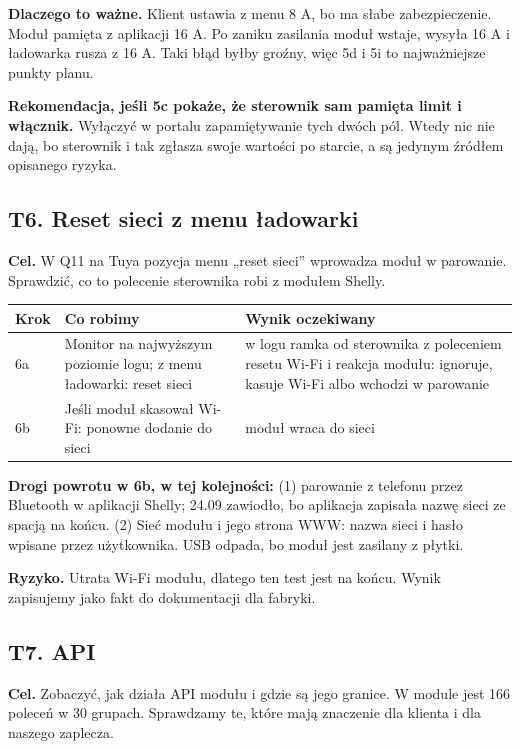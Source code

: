 \documentclass[11pt,a4paper]{article}
\begin{document}
\textbf{Dlaczego to ważne.} Klient ustawia z menu 8 A, bo ma słabe zabezpieczenie. Moduł pamięta z aplikacji 16 A. Po zaniku zasilania moduł wstaje, wysyła 16 A i ładowarka rusza z 16 A. Taki błąd byłby groźny, więc 5d i 5i to najważniejsze punkty planu.


\textbf{Rekomendacja, jeśli 5c pokaże, że sterownik sam pamięta limit i włącznik.} Wyłączyć w portalu zapamiętywanie tych dwóch pól. Wtedy nic nie dają, bo sterownik i tak zgłasza swoje wartości po starcie, a są jedynym źródłem opisanego ryzyka.


\subsection{T6. Reset sieci z menu ładowarki}

\textbf{Cel.} W Q11 na Tuya pozycja menu „reset sieci” wprowadza moduł w parowanie. Sprawdzić, co to polecenie sterownika robi z modułem Shelly.


\begin{longtable}{>{\raggedright\arraybackslash}p{3.00cm}>{\raggedright\arraybackslash}p{5.55cm}>{\raggedright\arraybackslash}p{6.73cm}}
\toprule
\rowcolor{apteallight}\textbf{Krok} & \textbf{Co robimy} & \textbf{Wynik oczekiwany} \\
\midrule\endhead
\bottomrule\endfoot
6a & Monitor na najwyższym poziomie logu; z menu ładowarki: reset sieci & w logu ramka od sterownika z poleceniem resetu Wi-Fi i reakcja modułu: ignoruje, kasuje Wi-Fi albo wchodzi w parowanie \\
6b & Jeśli moduł skasował Wi-Fi: ponowne dodanie do sieci & moduł wraca do sieci \\
\end{longtable}

\textbf{Drogi powrotu w 6b, w tej kolejności:} (1) parowanie z telefonu przez Bluetooth w aplikacji Shelly; 24.09 zawiodło, bo aplikacja zapisała nazwę sieci ze spacją na końcu. (2) Sieć modułu i jego strona WWW: nazwa sieci i hasło wpisane przez użytkownika. USB odpada, bo moduł jest zasilany z płytki.


\textbf{Ryzyko.} Utrata Wi-Fi modułu, dlatego ten test jest na końcu. Wynik zapisujemy jako fakt do dokumentacji dla fabryki.


\subsection{T7. API}

\textbf{Cel.} Zobaczyć, jak działa API modułu i gdzie są jego granice. W module jest 166 poleceń w 30 grupach. Sprawdzamy te, które mają znaczenie dla klienta i dla naszego zaplecza.
\end{document}
